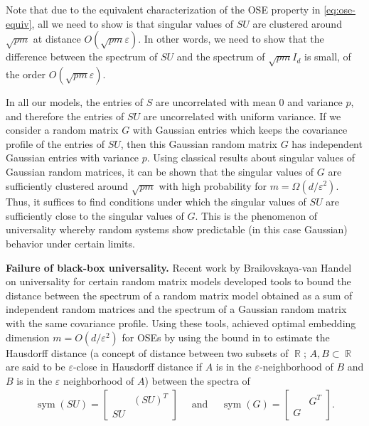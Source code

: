 \documentclass[11pt]{amsart}
\numberwithin{equation}{section}
\numberwithin{equation}{section}
\DeclareMathOperator{\R}{\mathbb{R}}
\DeclareMathOperator{\sym}{sym}
\theoremstyle{remark}
\theoremstyle{definition}
\begin{document}
Note that due to the equivalent characterization of the OSE property in \eqref{eq:ose-equiv}, all we need to show is that singular values of $SU$ are clustered around $\sqrt{pm}$ at distance $O(\sqrt{pm} \varepsilon)$. In other words, we need to show that the difference between the spectrum of $SU$ and the spectrum of $\sqrt{pm}I_{d}$ is small, of the order $O(\sqrt{pm} \varepsilon)$. 

In all our models, the entries of $S$ are uncorrelated with mean $0$ and variance $p$, and therefore the entries of $SU$ are uncorrelated with uniform variance. If we consider a random matrix $G$ with Gaussian entries which keeps the covariance profile of the entries of $SU$, then this Gaussian random matrix $G$ has independent Gaussian entries with variance $p$. Using classical results about singular values of Gaussian random matrices, it can be shown that the singular values of $G$ are sufficiently clustered around $\sqrt{pm}$ with high probability for $m = \Omega(d/\varepsilon^2)$.  Thus, it suffices to find conditions under which the singular values of $SU$ are sufficiently close to the singular values of $G$. This is the phenomenon of universality whereby random systems show predictable (in this case Gaussian) behavior under certain limits.

\textbf{Failure of black-box universality.}
Recent work by Brailovskaya-van Handel \cite{brailovskaya2022universality} on universality for certain random matrix models developed tools to bound the distance between the spectrum of a random matrix model obtained as a sum of independent random matrices and the spectrum of a Gaussian random matrix with the same covariance profile. Using these tools, \cite{chenakkod2024optimal} achieved optimal embedding dimension $m=O(d/\varepsilon^2)$ for OSEs by using the bound in \cite[Theorem 2.6]{brailovskaya2022universality} to estimate the Hausdorff distance (a concept of distance between two subsets of $\R$; $A,B \subset \R$ are said to be $\varepsilon$-close in Hausdorff distance if $A$ is in the $\varepsilon$-neighborhood of $B$ and $B$ is in the $\varepsilon$ neighborhood of $A$) between the spectra of \begin{align*}
    \sym(SU)=\left[ {\begin{array}{*{20}{c}}
  {}&{{(SU)^T}} \\ 
  SU&{} 
\end{array}} \right] \quad \text{ and } \quad \sym(G)=\left[ {\begin{array}{*{20}{c}}
  {}&{{G^T}} \\ 
  G&{} 
\end{array}} \right].
\end{align*}
\end{document}
